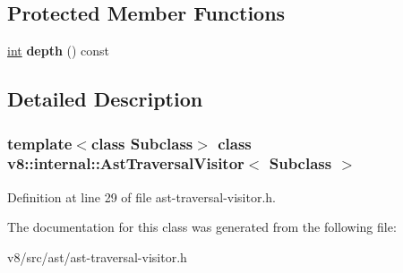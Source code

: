 \subsection*{Protected Member Functions}
\begin{DoxyCompactItemize}
\item 
\mbox{\label{classv8_1_1internal_1_1AstTraversalVisitor_a3f5e26390b38eba9c0cf3ebe4a3dae3f}} 
\mbox{\hyperlink{classint}{int}} {\bfseries depth} () const
\end{DoxyCompactItemize}


\subsection{Detailed Description}
\subsubsection*{template$<$class Subclass$>$\newline
class v8\+::internal\+::\+Ast\+Traversal\+Visitor$<$ Subclass $>$}



Definition at line 29 of file ast-\/traversal-\/visitor.\+h.



The documentation for this class was generated from the following file\+:\begin{DoxyCompactItemize}
\item 
v8/src/ast/ast-\/traversal-\/visitor.\+h\end{DoxyCompactItemize}
